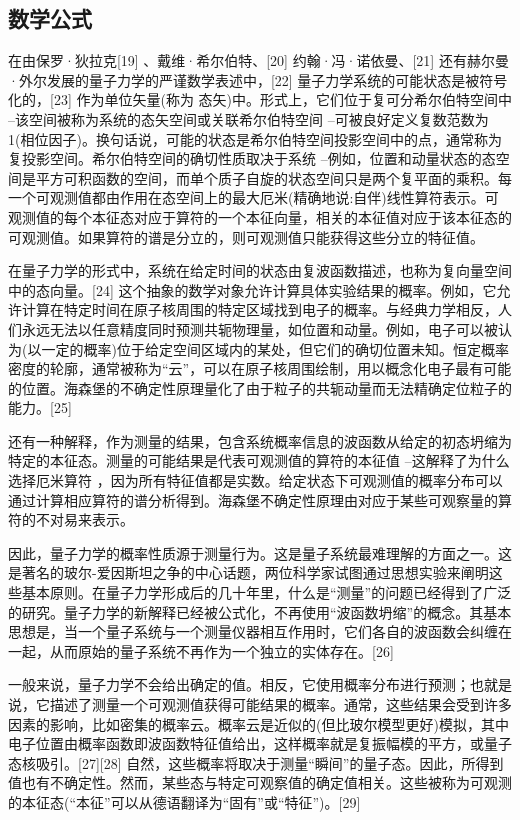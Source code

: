 \subsection{ 数学公式}
在由保罗·狄拉克[19] 、戴维·希尔伯特、[20] 约翰·冯·诺依曼、[21] 还有赫尔曼·外尔发展的量子力学的严谨数学表述中，[22] 量子力学系统的可能状态是被符号化的，[23] 作为单位矢量(称为 态矢)中。形式上，它们位于复可分希尔伯特空间中 –该空间被称为系统的态矢空间或关联希尔伯特空间  –可被良好定义复数范数为1(相位因子)。换句话说，可能的状态是希尔伯特空间投影空间中的点，通常称为复投影空间。希尔伯特空间的确切性质取决于系统 –例如，位置和动量状态的态空间是平方可积函数的空间，而单个质子自旋的状态空间只是两个复平面的乘积。每一个可观测值都由作用在态空间上的最大厄米(精确地说:自伴)线性算符表示。可观测值的每个本征态对应于算符的一个本征向量，相关的本征值对应于该本征态的可观测值。如果算符的谱是分立的，则可观测值只能获得这些分立的特征值。

在量子力学的形式中，系统在给定时间的状态由复波函数描述，也称为复向量空间中的态向量。[24] 这个抽象的数学对象允许计算具体实验结果的概率。例如，它允许计算在特定时间在原子核周围的特定区域找到电子的概率。与经典力学相反，人们永远无法以任意精度同时预测共轭物理量，如位置和动量。例如，电子可以被认为(以一定的概率)位于给定空间区域内的某处，但它们的确切位置未知。恒定概率密度的轮廓，通常被称为“云”，可以在原子核周围绘制，用以概念化电子最有可能的位置。海森堡的不确定性原理量化了由于粒子的共轭动量而无法精确定位粒子的能力。[25]

还有一种解释，作为测量的结果，包含系统概率信息的波函数从给定的初态坍缩为特定的本征态。测量的可能结果是代表可观测值的算符的本征值 –这解释了为什么选择厄米算符 ，因为所有特征值都是实数。给定状态下可观测值的概率分布可以通过计算相应算符的谱分析得到。海森堡不确定性原理由对应于某些可观察量的算符的不对易来表示。

因此，量子力学的概率性质源于测量行为。这是量子系统最难理解的方面之一。这是著名的玻尔-爱因斯坦之争的中心话题，两位科学家试图通过思想实验来阐明这些基本原则。在量子力学形成后的几十年里，什么是“测量”的问题已经得到了广泛的研究。量子力学的新解释已经被公式化，不再使用“波函数坍缩”的概念。其基本思想是，当一个量子系统与一个测量仪器相互作用时，它们各自的波函数会纠缠在一起，从而原始的量子系统不再作为一个独立的实体存在。[26]

一般来说，量子力学不会给出确定的值。相反，它使用概率分布进行预测；也就是说，它描述了测量一个可观测值获得可能结果的概率。通常，这些结果会受到许多因素的影响，比如密集的概率云。概率云是近似的(但比玻尔模型更好)模拟，其中电子位置由概率函数即波函数特征值给出，这样概率就是复振幅模的平方，或量子态核吸引。[27][28] 自然，这些概率将取决于测量“瞬间”的量子态。因此，所得到值也有不确定性。然而，某些态与特定可观察值的确定值相关。这些被称为可观测的本征态(“本征”可以从德语翻译为“固有”或“特征”)。[29]

